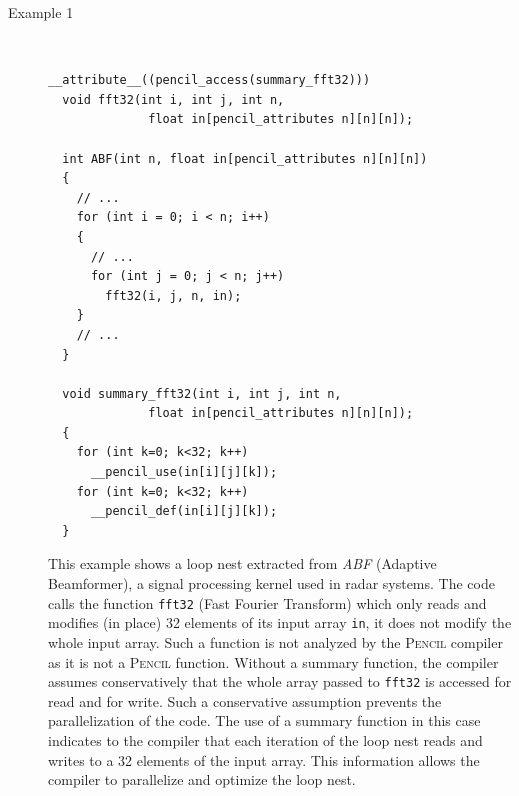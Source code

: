 \documentclass{carp}
\newcommand\pencil{\textsc{Pencil}\xspace}
\begin{document}
\begin{description}
% 
% 
% 
% 

  
\item[Example 1]~
  \begin{lstlisting}[language=pencil]
  __attribute__((pencil_access(summary_fft32)))
  void fft32(int i, int j, int n,
              float in[pencil_attributes n][n][n]);

  int ABF(int n, float in[pencil_attributes n][n][n])
  {
    // ...
    for (int i = 0; i < n; i++)
    {
      // ...
      for (int j = 0; j < n; j++)
        fft32(i, j, n, in);
    }
    // ...
  }

  void summary_fft32(int i, int j, int n,
              float in[pencil_attributes n][n][n]);
  {
    for (int k=0; k<32; k++)
      __pencil_use(in[i][j][k]);
    for (int k=0; k<32; k++)
      __pencil_def(in[i][j][k]);
  }
  \end{lstlisting}
  
  This example shows a loop nest extracted from
  \emph{ABF} (Adaptive Beamformer), a signal processing kernel used in radar
  systems.
  The code calls the function \lstinline!fft32! (Fast Fourier Transform)
  which only reads and modifies (in place) 32 elements of its input
  array \lstinline!in!, it does not modify the whole input array.
  Such a function is not analyzed by the \pencil compiler as it is not a \pencil
  function.
  Without a summary function, the compiler assumes conservatively that the whole
  array passed to \lstinline!fft32! is accessed for read and for write.
  Such a conservative assumption prevents the parallelization of the code.
  The use of a summary function in this case indicates to the compiler that
  each iteration of the loop nest reads and writes to a 32 elements
  of the input array.
  This information allows the compiler to parallelize and optimize the loop
  nest.


\end{description}
\end{document}
